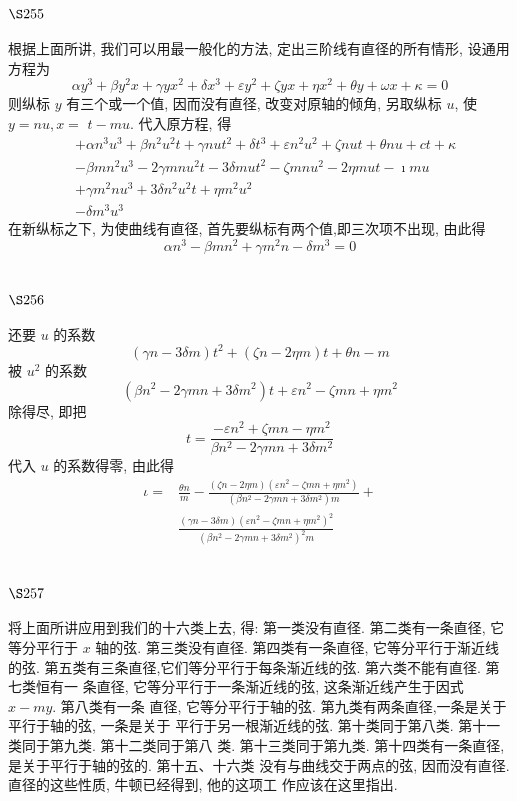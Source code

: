 \section{$\S 255$}

根据上面所讲, 我们可以用最一般化的方法, 定出三阶线有直径的所有情形, 设通用 方程为
\[
\alpha y^{3}+\beta y^{2} x+\gamma y x^{2}+\delta x^{3}+\varepsilon y^{2}+\zeta y x+\eta x^{2}+\theta y+\omega x+\kappa=0
\]
则纵标 $y$ 有三个或一个值, 因而没有直径, 改变对原轴的倾角, 另取纵标 $u$, 使 $y=n u, x=$ $t-m u$. 代入原方程, 得 
\[
\begin{aligned}
& +\alpha n^{3} u^{3}+\beta n^{2} u^{2} t+\gamma n u t^{2}+\delta t^{3}+\varepsilon n^{2} u^{2}+\zeta n u t+\theta n u+c t+\kappa \\
& -\beta m n^{2} u^{3}-2 \gamma m n u^{2} t-3 \delta m u t^{2}-\zeta m n u^{2}-2 \eta m u t-\imath m u \\
& +\gamma m^{2} n u^{3}+3 \delta n^{2} u^{2} t+\eta m^{2} u^{2} \\
& -\delta m^{3} u^{3}
\end{aligned}
\]
在新纵标之下, 为使曲线有直径, 首先要纵标有两个值,即三次项不出现, 由此得
\[
\alpha n^{3}-\beta m n^{2}+\gamma m^{2} n-\delta m^{3}=0
\]
\section{$\S 256$}

还要 $u$ 的系数
\[
(\gamma n-3 \delta m) t^{2}+(\zeta n-2 \eta m) t+\theta n-m
\]
被 $u^{2}$ 的系数
\[
\left(\beta n^{2}-2 \gamma m n+3 \delta m^{2}\right) t+\varepsilon n^{2}-\zeta m n+\eta m^{2}
\]
除得尽, 即把
\[
t=\frac{-\varepsilon n^{2}+\zeta m n-\eta m^{2}}{\beta n^{2}-2 \gamma m n+3 \delta m^{2}}
\]
代入 $u$ 的系数得零, 由此得
\[
\begin{aligned}
\iota= & \frac{\theta n}{m}-\frac{(\zeta n-2 \eta m)\left(\varepsilon n^{2}-\zeta m n+\eta m^{2}\right)}{\left(\beta n^{2}-2 \gamma m n+3 \delta m^{2}\right) m}+ \\
& \frac{(\gamma n-3 \delta m)\left(\varepsilon n^{2}-\zeta m n+\eta m^{2}\right)^{2}}{\left(\beta n^{2}-2 \gamma m n+3 \delta m^{2}\right)^{2} m}
\end{aligned}
\]
\section{$\S 257$}
将上面所讲应用到我们的十六类上去, 得: 第一类没有直径. 第二类有一条直径, 它 等分平行于 $x$ 轴的弦. 第三类没有直径. 第四类有一条直径, 它等分平行于渐近线的弦. 第五类有三条直径,它们等分平行于每条渐近线的弦. 第六类不能有直径. 第七类恒有一 条直径, 它等分平行于一条渐近线的弦, 这条渐近线产生于因式 $x-m y$. 第八类有一条 直径, 它等分平行于轴的弦. 第九类有两条直径,一条是关于平行于轴的弦, 一条是关于 平行于另一根渐近线的弦. 第十类同于第八类. 第十一类同于第九类. 第十二类同于第八 类. 第十三类同于第九类. 第十四类有一条直径, 是关于平行于轴的弦的. 第十五、十六类 没有与曲线交于两点的弦, 因而没有直径. 直径的这些性质, 牛顿已经得到, 他的这项工 作应该在这里指出.


